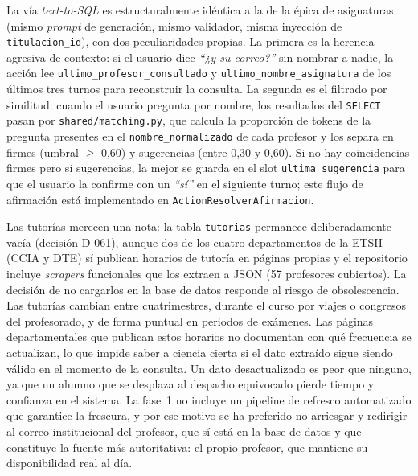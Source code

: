 La vía \textit{text-to-SQL} es estructuralmente idéntica a la de la épica de asignaturas (mismo \textit{prompt} de generación, mismo validador, misma inyección de \texttt{titulacion\_id}), con dos peculiaridades propias. La primera es la herencia agresiva de contexto: si el usuario dice \textit{``¿y su correo?''} sin nombrar a nadie, la acción lee \texttt{ultimo\_profesor\_consultado} y \texttt{ultimo\_nombre\_asignatura} de los últimos tres turnos para reconstruir la consulta. La segunda es el filtrado por similitud: cuando el usuario pregunta por nombre, los resultados del \texttt{SELECT} pasan por \texttt{shared/matching.py}, que calcula la proporción de tokens de la pregunta presentes en el \texttt{nombre\_normalizado} de cada profesor y los separa en firmes (umbral $\geq$ 0,60) y sugerencias (entre 0,30 y 0,60). Si no hay coincidencias firmes pero sí sugerencias, la mejor se guarda en el slot \texttt{ultima\_sugerencia} para que el usuario la confirme con un \textit{``sí''} en el siguiente turno; este flujo de afirmación está implementado en \texttt{ActionResolverAfirmacion}.

Las tutorías merecen una nota: la tabla \texttt{tutorias} permanece deliberadamente vacía (decisión D-061), aunque dos de los cuatro departamentos de la ETSII (CCIA y DTE) sí publican horarios de tutoría en páginas propias y el repositorio incluye \textit{scrapers} funcionales que los extraen a JSON (57 profesores cubiertos). La decisión de no cargarlos en la base de datos responde al riesgo de obsolescencia. Las tutorías cambian entre cuatrimestres, durante el curso por viajes o congresos del profesorado, y de forma puntual en periodos de exámenes. Las páginas departamentales que publican estos horarios no documentan con qué frecuencia se actualizan, lo que impide saber a ciencia cierta si el dato extraído sigue siendo válido en el momento de la consulta. Un dato desactualizado es peor que ninguno, ya que un alumno que se desplaza al despacho equivocado pierde tiempo y confianza en el sistema. La fase~1 no incluye un pipeline de refresco automatizado que garantice la frescura, y por ese motivo se ha preferido no arriesgar y redirigir al correo institucional del profesor, que sí está en la base de datos y que constituye la fuente más autoritativa: el propio profesor, que mantiene su disponibilidad real al día.

